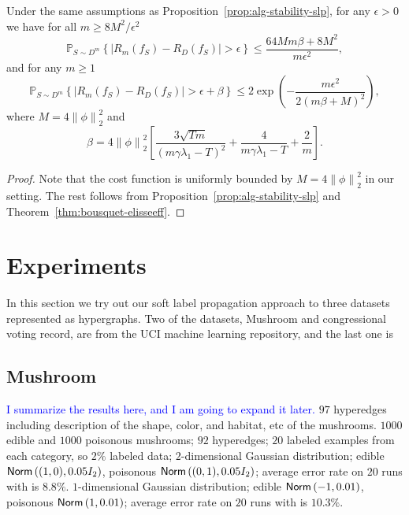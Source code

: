 \documentclass[letterpaper]{article} %
\begin{document}
\begin{theorem}
  Under the same assumptions as Proposition~\ref{prop:alg-stability-slp}, for any $\epsilon>0$ we have for all $m\geq 8M^2/\epsilon^2$
  \begin{equation}
    \label{eq:fraction-bounds}
    \mathbb{P}_{S\sim D^m} \left\{ \left| R_m \left( f_S \right)-R_D \left( f_S \right) \right| > \epsilon\right\}\leq \frac{64 Mm\beta+8M^2}{m\epsilon^2},
  \end{equation}
  and for any $m\geq 1$
  \begin{equation}
    \label{eq:exponential-bounds}
    \mathbb{P}_{S\sim D^m} \left\{ \left| R_m \left( f_S \right)-R_D \left( f_S \right) \right| > \epsilon+\beta\right\}\leq 2\exp \left( -\frac{m\epsilon^2}{2 \left( m\beta+M \right)^2} \right),
  \end{equation}
  where $M=4\left\| \phi \right\|_2^2$ and
  \begin{equation*}
    \beta=4\left\| \phi \right\|_2^2\left[\frac{3\sqrt{Tm}}{\left( m\gamma\lambda_1-T \right)^2}+\frac{4}{m\gamma\lambda_1-T}+\frac{2}{m}\right].
  \end{equation*}
\end{theorem}

\begin{proof}
  Note that the cost function is uniformly bounded by $M=4 \left\| \phi \right\|_2^2$ in our setting. The rest follows from Proposition~\ref{prop:alg-stability-slp} and Theorem~\ref{thm:bousquet-elisseeff}.
\end{proof}









	




\section{Experiments}
In this section we try out our soft label propagation approach to three datasets represented as hypergraphs. Two of the datasets, Mushroom and congressional voting record, are from the UCI machine learning repository, and the last one is 
\subsection{Mushroom}
\textcolor{blue}{I summarize the results here, and I am going to expand it later.}
$97$ hyperedges including description of the shape, color, and habitat, etc of the mushrooms. 
$1000$ edible and $1000$ poisonous mushrooms; 
$92$ hyperedges;
$20$ labeled examples from each category, so $2\%$ labeled data;
$2$-dimensional Gaussian distribution; edible $\mathsf{Norm}\left((1, 0), 0.05I_2\right)$, poisonous $\mathsf{Norm}\left((0, 1), 0.05I_2\right)$; average error rate on $20$ runs with is $8.8\%$.
$1$-dimensional Gaussian distribution; edible $\mathsf{Norm}\left(-1, 0.01\right)$, poisonous $\mathsf{Norm}\left(1, 0.01\right)$; average error rate on $20$ runs with is $10.3\%$.
\end{document}
